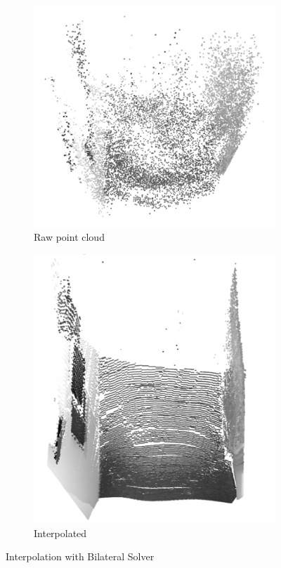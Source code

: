 \begin{figure}[ht!]

    \centering
    \begin{subfigure}[b]{0.4\textwidth}
        \centering
        \includegraphics[width=\linewidth]{images/DepthFromMotionBilateral1}
        \caption{Raw point cloud}
    \end{subfigure}%
    \begin{subfigure}[b]{0.4\textwidth}
        \centering
        \includegraphics[width=\linewidth]{images/DepthFromMotionBilateral2}
        \caption{Interpolated}
    \end{subfigure}%
    \caption{Interpolation with Bilateral Solver}
    \label{fig:depth-from-motion-interpolation}
\end{figure}

